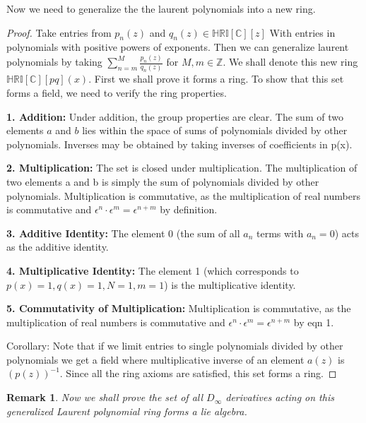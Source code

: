 \documentclass[10pt, oneside]{article}
\newcommand{\C}{\mathbb{C}}
\newcommand{\Z}{\mathbb{Z}}
\newcommand{\HRI}{\mathbb{HRI}}
\newtheorem{rem}{Remark}
\begin{document}
Now we need to generalize the the laurent polynomials into a new ring. 
\begin{proof}
    Take entries from $p_n(z)$ and $q_n(z) \in \HRI[\C][z]$ With entries in polynomials with positive powers of exponents. Then we can generalize laurent polynomials by taking $\sum_{n=m}^{M} \frac{p_n(z)}{q_n(z)}$ for $M,m \in \Z$.
    We shall denote this new ring $\HRI[\C][pq](x)$. First we shall prove it forms a ring. 
    To show that this set forms a field, we need to verify the ring properties.

    \textbf{1. Addition:} Under addition, the group properties are clear. The sum of two elements \( a \) and \( b \) lies within the space of sums of polynomials divided by other polynomials. Inverses may be obtained by taking inverses of coefficients in p(x).

    \textbf{2. Multiplication:} The set is closed under multiplication. The multiplication of two elements a and b is simply the sum of polynomials divided by other polynomials. Multiplication is commutative, as the multiplication of real numbers is commutative and \( \epsilon^n \cdot \epsilon^m = \epsilon^{n+m} \) by definition.

    \textbf{3. Additive Identity:} The element 0 (the sum of all \( a_n \) terms with \( a_n = 0 \)) acts as the additive identity.

    \textbf{4. Multiplicative Identity:} The element 1 (which corresponds to \(p(x) = 1, q(x)=1, N=1, m=1 \)) is the multiplicative identity.

    \textbf{5. Commutativity of Multiplication:} Multiplication is commutative, as the multiplication of real numbers is commutative and \( \epsilon^n \cdot \epsilon^m = \epsilon^{n+m} \) by eqn 1.

    Corollary: Note that if we limit entries to single polynomials divided by other polynomials we get a field where multiplicative inverse of an element $a(z)$ is $(p(z))^{-1}$.
    Since all the ring axioms are satisfied, this set forms a ring.
\end{proof}
\begin{rem}
    Now we shall prove the set of all $D_\infty$ derivatives acting on this generalized Laurent polynomial ring forms a lie algebra. 
\end{rem}
\end{document}
